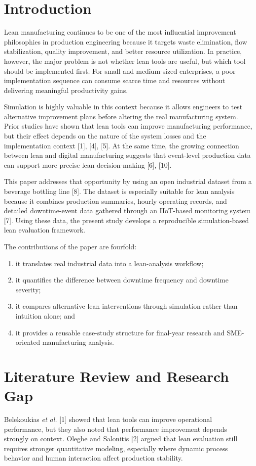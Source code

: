 \documentclass[conference]{IEEEtran}
\begin{document}
\section{Introduction}
Lean manufacturing continues to be one of the most influential improvement philosophies in production engineering because it targets waste elimination, flow stabilization, quality improvement, and better resource utilization. In practice, however, the major problem is not whether lean tools are useful, but which tool should be implemented first. For small and medium-sized enterprises, a poor implementation sequence can consume scarce time and resources without delivering meaningful productivity gains.

Simulation is highly valuable in this context because it allows engineers to test alternative improvement plans before altering the real manufacturing system. Prior studies have shown that lean tools can improve manufacturing performance, but their effect depends on the nature of the system losses and the implementation context [1], [4], [5]. At the same time, the growing connection between lean and digital manufacturing suggests that event-level production data can support more precise lean decision-making [6], [10].

This paper addresses that opportunity by using an open industrial dataset from a beverage bottling line [8]. The dataset is especially suitable for lean analysis because it combines production summaries, hourly operating records, and detailed downtime-event data gathered through an IIoT-based monitoring system [7]. Using these data, the present study develops a reproducible simulation-based lean evaluation framework.

The contributions of the paper are fourfold:
\begin{enumerate}
    \item it translates real industrial data into a lean-analysis workflow;
    \item it quantifies the difference between downtime frequency and downtime severity;
    \item it compares alternative lean interventions through simulation rather than intuition alone; and
    \item it provides a reusable case-study structure for final-year research and SME-oriented manufacturing analysis.
\end{enumerate}

\section{Literature Review and Research Gap}
Belekoukias \emph{et al.} [1] showed that lean tools can improve operational performance, but they also noted that performance improvement depends strongly on context. Oleghe and Salonitis [2] argued that lean evaluation still requires stronger quantitative modeling, especially where dynamic process behavior and human interaction affect production stability.
\end{document}
